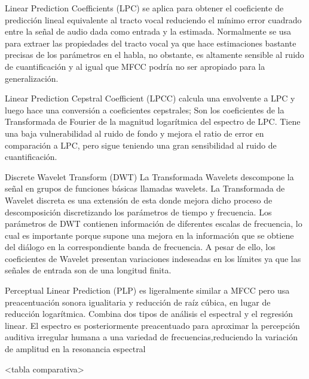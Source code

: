 \documentclass[11pt,a4paper,spanish]{book}
\begin{document}
		Linear Prediction Coefficients (LPC) se aplica para obtener el coeficiente de predicción lineal equivalente al tracto vocal reduciendo el mínimo error cuadrado entre la señal de audio dada como entrada y la estimada. Normalmente se usa para extraer las propiedades del tracto vocal ya que hace estimaciones bastante precisas de los parámetros en el habla, no obstante, es altamente sensible al ruido de cuantificación y al igual que MFCC podría no ser apropiado para la generalización.
		
		Linear Prediction Cepstral Coefficient (LPCC) calcula una envolvente a LPC y luego hace una conversión a coeficientes cepstrales; Son los coeficientes de la Transformada de Fourier de la magnitud logarítmica del espectro de LPC. Tiene una baja vulnerabilidad al ruido de fondo y mejora el ratio de error en comparación a LPC, pero sigue teniendo una gran sensibilidad al ruido de cuantificación.
		
		Discrete Wavelet Transform (DWT) La Transformada Wavelets descompone la señal en grupos de funciones básicas llamadas wavelets. La Transformada de Wavelet discreta es una extensión de esta donde mejora dicho proceso de descomposición discretizando los parámetros de tiempo y frecuencia. Los parámetros de DWT contienen información de diferentes escalas de frecuencia, lo cual es importante porque supone una mejora en la información que se obtiene del diálogo en la correspondiente banda de frecuencia. A pesar de ello, los coeficientes de Wavelet presentan variaciones indeseadas en los límites ya que las señales de entrada son de una longitud finita.
		
		Perceptual Linear Prediction (PLP) es ligeralmente similar a MFCC pero usa preacentuación sonora igualitaria y reducción de raíz cúbica, en lugar de reducción logarítmica. Combina dos tipos de análisis el espectral y el regresión linear. El espectro es posteriormente preacentuado para aproximar la percepción auditiva irregular humana a una variedad de frecuencias,reduciendo la variación de amplitud en la resonancia espectral
		
		<tabla comparativa>
		
		\printbibliography
	
\end{document}
